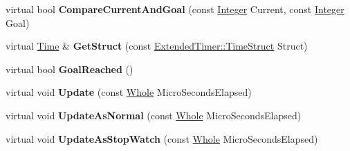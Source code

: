\begin{DoxyCompactItemize}
\item 
\hypertarget{classphys_1_1ExtendedTimer_ae71b57d5a274f77edb37a9606eaa02bb}{
virtual bool {\bfseries CompareCurrentAndGoal} (const \hyperlink{namespacephys_a7f09bf5585b2bb97613cd9aad4273a81}{Integer} Current, const \hyperlink{namespacephys_a7f09bf5585b2bb97613cd9aad4273a81}{Integer} Goal)}
\label{classphys_1_1ExtendedTimer_ae71b57d5a274f77edb37a9606eaa02bb}

\item 
\hypertarget{classphys_1_1ExtendedTimer_a94f3140d4eba930ed76cc530b4f847b7}{
virtual \hyperlink{structphys_1_1Time}{Time} \& {\bfseries GetStruct} (const \hyperlink{classphys_1_1ExtendedTimer_a0f316e9347d1c118a157cc3c737c554b}{ExtendedTimer::TimeStruct} Struct)}
\label{classphys_1_1ExtendedTimer_a94f3140d4eba930ed76cc530b4f847b7}

\item 
\hypertarget{classphys_1_1ExtendedTimer_ae3684bd4b2638617e86df3cb78813ce6}{
virtual bool {\bfseries GoalReached} ()}
\label{classphys_1_1ExtendedTimer_ae3684bd4b2638617e86df3cb78813ce6}

\item 
\hypertarget{classphys_1_1ExtendedTimer_ac5e604ad911911939ba190520f8c3399}{
virtual void {\bfseries Update} (const \hyperlink{namespacephys_a460f6bc24c8dd347b05e0366ae34f34a}{Whole} MicroSecondsElapsed)}
\label{classphys_1_1ExtendedTimer_ac5e604ad911911939ba190520f8c3399}

\item 
\hypertarget{classphys_1_1ExtendedTimer_af790c2d0fdaf009b77b8a351ab95026e}{
virtual void {\bfseries UpdateAsNormal} (const \hyperlink{namespacephys_a460f6bc24c8dd347b05e0366ae34f34a}{Whole} MicroSecondsElapsed)}
\label{classphys_1_1ExtendedTimer_af790c2d0fdaf009b77b8a351ab95026e}

\item 
\hypertarget{classphys_1_1ExtendedTimer_a2df54619bf6a74d8c44c877352b3f323}{
virtual void {\bfseries UpdateAsStopWatch} (const \hyperlink{namespacephys_a460f6bc24c8dd347b05e0366ae34f34a}{Whole} MicroSecondsElapsed)}
\label{classphys_1_1ExtendedTimer_a2df54619bf6a74d8c44c877352b3f323}

\end{DoxyCompactItemize}

